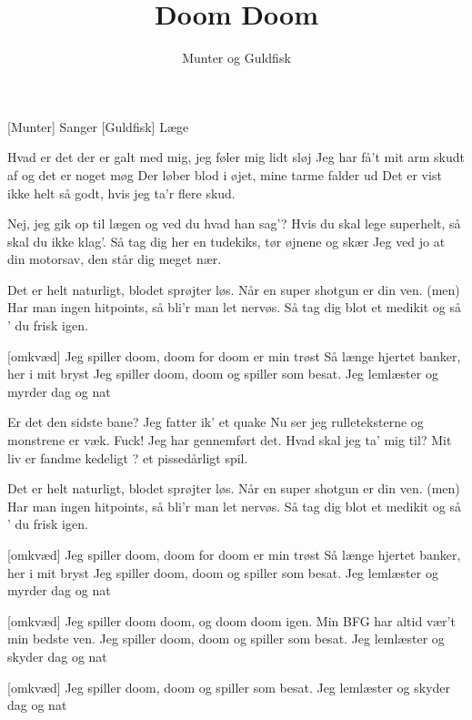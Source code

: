 \documentclass[a4paper,11pt]{article}
\title{Doom Doom}
\author{Munter og Guldfisk}
\begin{document}
\maketitle

\begin{roles}
[Munter] Sanger
[Guldfisk] Læge
\end{roles}

\begin{props}
\end{props}

  
\begin{song}
 Hvad er det der er galt med mig, jeg føler mig lidt sløj
Jeg har få't mit arm skudt af og det er noget møg
Der løber blod i øjet, mine tarme falder ud
Det er vist ikke helt så godt, hvis jeg ta'r flere skud.

 Nej, jeg gik op til lægen og ved du hvad han sag'?
 Hvis du skal lege superhelt, så skal du ikke klag'.
Så tag dig her en tudekiks, tør øjnene og skær
Jeg ved jo at din motorsav, den står dig meget nær.

 Det er helt naturligt, blodet sprøjter løs.
Når en super shotgun er din ven.
(men) Har man ingen hitpoints, så bli'r man let nervøs.
Så tag dig blot et medikit og så ' du frisk igen.

[omkvæd] Jeg spiller doom, doom for doom er min trøst
Så længe hjertet banker, her i mit bryst
Jeg spiller doom, doom og spiller som besat.
Jeg lemlæster og myrder dag og nat

 Er det den sidste bane? Jeg fatter ik' et quake
Nu ser jeg rulleteksterne og monstrene er væk.
Fuck! Jeg har gennemført det. Hvad skal jeg ta' mig til?
Mit liv er fandme kedeligt ? et pissedårligt spil.

 Det er helt naturligt, blodet sprøjter løs.
Når en super shotgun er din ven.
(men) Har man ingen hitpoints, så bli'r man let nervøs.
Så tag dig blot et medikit og så ' du frisk igen.

[omkvæd] Jeg spiller doom, doom for doom er min trøst
Så længe hjertet banker, her i mit bryst
Jeg spiller doom, doom og spiller som besat.
Jeg lemlæster og myrder dag og nat

[omkvæd] Jeg spiller doom doom, og doom doom igen.
Min BFG har altid vær't min bedste ven.
Jeg spiller doom, doom og spiller som besat.
Jeg lemlæster og skyder dag og nat

[omkvæd] Jeg spiller doom, doom og spiller som besat.
Jeg lemlæster og skyder dag og nat




\end{song}
\end{document}
